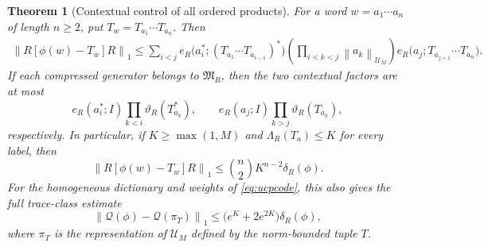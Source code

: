 \documentclass[11pt,a4paper]{amsart}
\numberwithin{equation}{section}
\newtheorem{theorem}{Theorem}[section]
\theoremstyle{definition}
\theoremstyle{remark}
\newcommand{\norm}[1]{\left\lVert#1\right\rVert}
\begin{document}
\begin{theorem}[Contextual control of all ordered products]\label{thm:contextual_multiplicativity}
For a word $w=a_1\cdots a_n$ of length $n\ge2$, put $T_w=T_{a_1}\cdots T_{a_n}$. Then
\begin{equation}\label{eq:contextual_word_bound}
 \begin{split}
 \norm{R[\phi(w)-T_w]R}_1
 \le\sum_{i<j}
 e_R\big(a_i^*;(T_{a_1}\cdots T_{a_{i-1}})^*\big)
 \left(\prod_{i<k<j}\norm{a_k}_{\mathcal U_M}\right)
 e_R\big(a_j;T_{a_{j+1}}\cdots T_{a_n}\big).
 \end{split}
\end{equation}
If each compressed generator belongs to $\mathfrak M_R$, then the two contextual factors are at most
\[
 e_R(a_i^*;I)\prod_{k<i}\vartheta_R(T_{a_k}^*),
 \qquad
 e_R(a_j;I)\prod_{k>j}\vartheta_R(T_{a_k}),
\]
respectively. In particular, if $K\ge\max(1,M)$ and $\Lambda_R(T_a)\le K$ for every label, then
\begin{equation}\label{eq:contextual_uniform_word}
 \norm{R[\phi(w)-T_w]R}_1
 \le\binom n2K^{n-2}\delta_R(\phi).
\end{equation}
For the homogeneous dictionary and weights of \eqref{eq:ucpcode}, this also gives the full trace-class estimate
\begin{equation}\label{eq:contextual_full_word_code}
 \norm{\mathcal Q(\phi)-\mathcal Q(\pi_T)}_1
 \le\big(e^K+2e^{2K}\big)\delta_R(\phi),
\end{equation}
where $\pi_T$ is the representation of $\mathcal U_M$ defined by the norm-bounded tuple $T$. 
\end{theorem}
\end{document}
